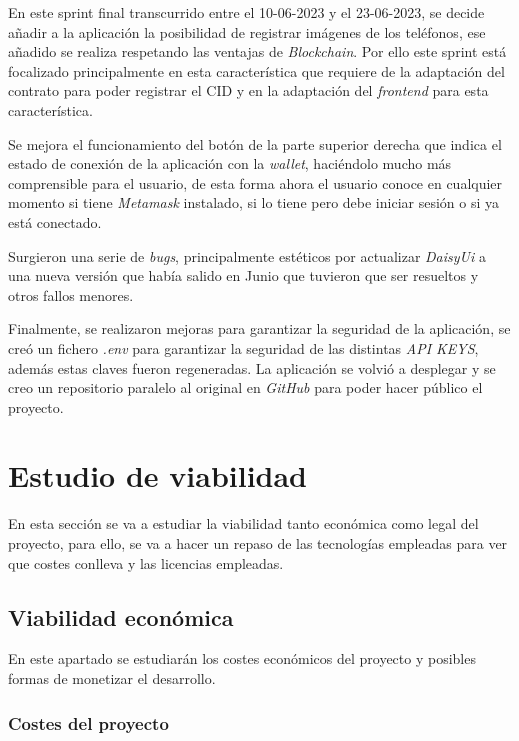 En este sprint final transcurrido entre el 10-06-2023 y el 23-06-2023, se decide añadir a la aplicación la posibilidad de registrar imágenes de los teléfonos, ese añadido se realiza respetando las ventajas de \textit{Blockchain}. Por ello este sprint está focalizado principalmente en esta característica que requiere de la adaptación del contrato para poder registrar el CID y en la adaptación del \textit{frontend} para esta característica.


Se mejora el funcionamiento del botón de la parte superior derecha que indica el estado de conexión de la aplicación con la \textit{wallet}, haciéndolo mucho más comprensible para el usuario, de esta forma ahora el usuario conoce en cualquier momento si tiene \textit{Metamask} instalado, si lo tiene pero debe iniciar sesión o si ya está conectado.

Surgieron una serie de \textit{bugs}, principalmente estéticos por actualizar \textit{DaisyUi} a una nueva versión que había salido en Junio que tuvieron que ser resueltos y otros fallos menores.

Finalmente, se realizaron mejoras para garantizar la seguridad de la aplicación, se creó un fichero \textit{.env} para garantizar la seguridad de las distintas \textit{API KEYS}, además estas claves fueron regeneradas. La aplicación se volvió a desplegar y se creo un repositorio paralelo al original en \textit{GitHub} para poder hacer público el proyecto.

\section{Estudio de viabilidad}

En esta sección se va a estudiar la viabilidad tanto económica como legal del proyecto, para ello, se va a hacer un repaso de las tecnologías empleadas para ver que costes conlleva y las licencias empleadas.

\subsection{Viabilidad económica}
En este apartado se estudiarán los costes económicos del proyecto y posibles formas de monetizar el desarrollo.

\subsubsection{Costes del proyecto}

